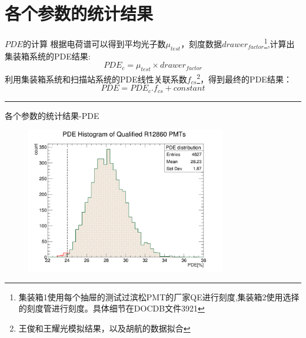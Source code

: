 \documentclass[11pt,compress,xcolor=x11names,UTF8]{beamer}
\begin{document}
\section{各个参数的统计结果}
\begin{frame}{$PDE$的计算}
根据电荷谱可以得到平均光子数$\mu_{test}$，刻度数据$drawer_{factor}$\footnote{集装箱1使用每个抽屉的测试过滨松PMT的厂家QE进行刻度,集装箱2使用选择的刻度管进行刻度。具体细节在DOCDB文件3921},计算出集装箱系统的PDE结果:
\begin{equation}
PDE_{c}=\mu_{test}\times drawer_{factor}
\end{equation}
利用集装箱系统和扫描站系统的PDE线性关联系数$f_{cs}$\footnote{王俊和王耀光模拟结果，以及胡航的数据拟合}，得到最终的PDE结果：
\begin{equation}
PDE=PDE_{c}.f_{cs}+constant
\label{pde_formula}
\end{equation}
\vspace{.5cm}
\hrule{\textwidth}
\vspace{.5cm}

\end{frame}
\begin{frame}{各个参数的统计结果-PDE}
\begin{figure}
\centering
\includegraphics[width=0.78\textwidth]{figures/pde.png}
\end{figure}
\end{frame}
\end{document}
